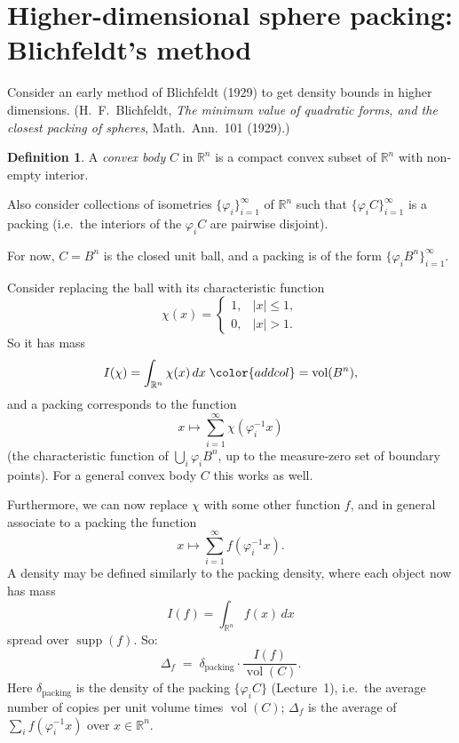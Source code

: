 \documentclass[11pt,openany]{book}
\theoremstyle{plain}
\theoremstyle{definition}
\newtheorem{definition}[theorem]{Definition}
\theoremstyle{remark}
\newcommand{\added}[1]{{\color{addcol}#1}}
\newcommand{\orig}[1]{\marginpar{\raggedright\scriptsize\color{gray}#1}}
\newcommand{\R}{\mathbb{R}}
\newcommand{\vol}{\operatorname{vol}}
\newcommand{\dens}{\delta}             %
\newcommand{\Ball}{B}                  %
\begin{document}
\section{Higher-dimensional sphere packing: Blichfeldt's method}\label{L2:sec:blichfeldt}

Consider an early method of Blichfeldt (1929) to get density bounds in higher dimensions.
\added{(H.~F.~Blichfeldt, \emph{The minimum value of quadratic forms, and the closest packing of spheres},
Math.\ Ann.\ 101 (1929).)}

\begin{definition}\label{L2:def:convexbody}
A \emph{convex body} $C$ in $\R^n$ is a compact convex subset of $\R^n$ with non-empty interior.
\end{definition}
\orig{Crossed out: ``(so think $C=\mathbb{B}^n$)''.}

Also consider collections of isometries $\{\varphi_i\}_{i=1}^\infty$ of $\R^n$ such that
$\{\varphi_iC\}_{i=1}^\infty$ is a packing \added{(i.e.\ the interiors of the $\varphi_iC$ are pairwise
disjoint)}.

For now, $C=\Ball^n$ \added{is the closed unit ball}, and a packing is of the form
$\{\varphi_i\Ball^n\}_{i=1}^\infty$.

Consider replacing the ball with its characteristic function
\[
\chi(x)=\begin{cases}1, & |x|\le1,\\ 0, & |x|>1.\end{cases}
\]
So it has mass
\[
I(\chi)=\int_{\R^n}\chi(x)\,dx \;\added{=\vol(\Ball^n)},
\]
and a packing corresponds to the function
\[
x\longmapsto\sum_{i=1}^\infty\chi(\varphi_i^{-1}x)
\]
\added{(the characteristic function of $\bigcup_i\varphi_i\Ball^n$, up to the measure-zero set of boundary
points).} For a general convex body $C$ this works as well.

Furthermore, we can now replace $\chi$ with some other function $f$, and in general associate to a packing
the function
\[
x\longmapsto\sum_{i=1}^\infty f(\varphi_i^{-1}x).
\]
A density may be defined similarly to the packing density, where each object now has mass
\[
I(f)=\int_{\R^n}f(x)\,dx
\]
spread over $\operatorname{supp}(f)$. So:
\[
\Delta_f \;=\; \dens_{\text{packing}}\cdot\frac{I(f)}{\vol(C)}.
\]
\added{Here $\dens_{\text{packing}}$ is the density of the packing $\{\varphi_iC\}$ (Lecture~1), i.e.\ the
average number of copies per unit volume times $\vol(C)$; $\Delta_f$ is the average of
$\sum_i f(\varphi_i^{-1}x)$ over $x\in\R^n$.}
\end{document}
